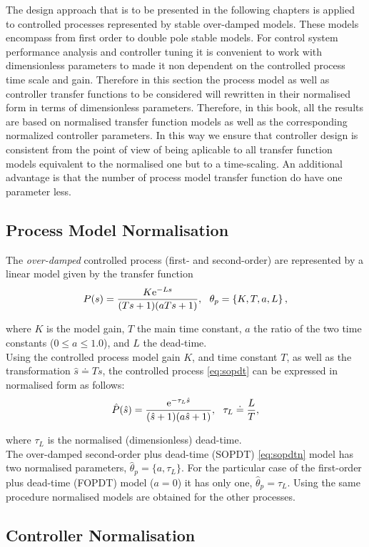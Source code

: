 The design approach that is to be presented in the following chapters is applied to controlled processes represented by stable over-damped models. These models encompass from first order to double pole stable models. For control system performance analysis and controller tuning it is convenient to work with dimensionless parameters to made it non dependent on the controlled process time scale and gain. Therefore in this section the process model as well as controller transfer functions to be considered will rewritten in their normalised form in terms of dimensionless parameters.  Therefore, in this book, all the results are based on normalised transfer function models as well as the corresponding normalized controller parameters. In this way we ensure that controller design is consistent from the point of view of being aplicable to all transfer function models equivalent to the normalised one but to a time-scaling.  An additional advantage is that the number of process model transfer function do have one parameter less.\\

\subsection{Process Model Normalisation}
\label{sec:3.2}

The \emph{over-damped} controlled process (first- and second-order) are represented by a linear model given by the transfer function
\begin{equation}
	P(s) = \frac{K \me^{-L s}}{(T s+1)(a T s+1)}, \ \ \theta_p=\left\{K, T, a, L \right\}, \label{eq:sopdt} 
\end{equation}

\noindent where $K$ is the model gain, $T$ the main time constant, $a$ the ratio of the two time constants ($0 \leq a \leq 1.0$), and $L$ the dead-time.\\

Using the controlled process model gain $K$, and time constant $T$, as well as the transformation $\hat s \doteq T s$, the controlled process \eqref{eq:sopdt} can be expressed in normalised form as follows:
\begin{equation}
	\hat P(\hat s) = \frac{\mathrm{e}^{-\tau_L \hat s}}{(\hat s +1)(a \hat s +1)}, \ \ \tau_L \doteq \frac{L}{T}, \label{eq:sopdtn}
\end{equation}

\noindent where $\tau_L$ is the normalised (dimensionless) dead-time.\\

The over-damped second-order plus dead-time (SOPDT) \eqref{eq:sopdtn} model has two normalised parameters, $\hat{\theta}_p = \{a, \tau_L\}$.  For the particular case of the first-order plus dead-time (FOPDT) model ($a=0$) it has only one, $\hat{\theta}_p = \tau_L$. Using the same procedure normalised models are obtained for the other processes.\\


\subsection{Controller Normalisation}
\label{sec:3.3}

